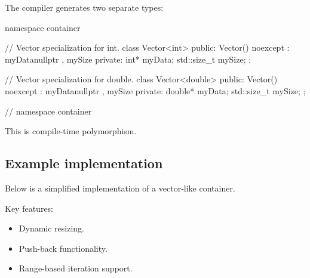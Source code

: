 \noindent The compiler generates two separate types:

\begin{cppcode}
namespace container
{
// Vector specialization for int.
class Vector<int>
{
public:
    Vector() noexcept
        : myData{nullptr}
        , mySize{}
    {}
private:
    int* myData;
    std::size_t mySize;
};

// Vector specialization for double.
class Vector<double>
{
public:
    Vector() noexcept
        : myData{nullptr}
        , mySize{}
    {}
private:
    double* myData;
    std::size_t mySize;
};
} // namespace container
\end{cppcode}

\noindent This is compile-time polymorphism.

\subsection{Example implementation}
\label{c5:sec:vectorimpl}
Below is a simplified implementation of a vector-like container.

Key features:
\begin{itemize}
  \item Dynamic resizing.
  \item Push-back functionality.
  \item Range-based iteration support.
\end{itemize}

